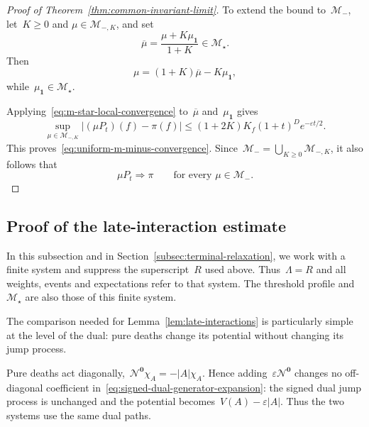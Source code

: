 \documentclass[EJP,preprint,NODS,nobera]{ejpecp}
\newcommand{\abs}[1]{\left|#1\right|}
\newcommand{\mb}[1]{\mathbf{#1}}
\newcommand{\Ncal}{\mathcal{N}}
\newcommand{\rev}[1]{{\color{red}#1}}
\begin{document}
\begin{proof}[Proof of Theorem~\ref{thm:common-invariant-limit}]
\rev{To extend the bound to~$\mathcal M_-$, let~$K\geq0$ and}
$\mu\in\mathcal M_{-,K}$, and set
\begin{equation*}
\overline\mu
=
\frac{\mu+K\mu_{\mb 1}}{1+K}
\in\mathcal M_\star.
\end{equation*}
Then
\begin{equation*}
\mu
=
(1+K)\overline\mu-K\mu_{\mb 1},
\end{equation*}
while~$\mu_{\mb 1}\in\mathcal M_\star$.

{\color{red}
Applying~\eqref{eq:m-star-local-convergence} to~$\overline\mu$ and~$\mu_{\mb1}$ gives
\begin{equation}
\label{eq:m-minus-reduction}
\sup_{\mu\in\mathcal M_{-,K}}
\abs{(\mu P_t)(f)-\pi(f)}
\leq(1+2K)K_f(1+t)^D e^{-\varepsilon t/2}.
\end{equation}
}
\rev{This proves~\eqref{eq:uniform-m-minus-convergence}.} Since~$\mathcal M_- = \bigcup_{K\geq0}\mathcal M_{-,K}$, it also follows that
\begin{equation*}
\mu P_t\Rightarrow\pi
\qquad
\text{for every }\mu\in\mathcal M_-.
\end{equation*}
\end{proof}

\subsection{\texorpdfstring{\rev{Proof of the late-interaction estimate}}{Proof of the late-interaction estimate}}
\label{subsec:proof-pure-death-comparison}

{\color{red}
In this subsection and in Section~\ref{subsec:terminal-relaxation}, we work
with a finite system and suppress the superscript~$R$ used above.
Thus~$\Lambda=R$ and all weights, events and expectations refer to that system.
The threshold profile and~$\mathcal M_\star$ are also those of this finite system.
}

{\color{red}
The comparison needed for Lemma~\ref{lem:late-interactions} is particularly simple at the
level of the dual: pure deaths change its potential without changing its
jump process.
}

\begin{remark}
\label{rem:pure-deaths-diagonal}
Pure deaths act diagonally,~$\Ncal^{\mb 0}\chi_A=-\abs{A}\chi_A$. Hence
adding~$\varepsilon\Ncal^{\mb 0}$ changes no off-diagonal coefficient
in~\eqref{eq:signed-dual-generator-expansion}: the signed dual jump process is
unchanged and the potential becomes~$V(A)-\varepsilon\abs{A}$. \rev{Thus the two systems use the same dual paths.}
\end{remark}
\end{document}
